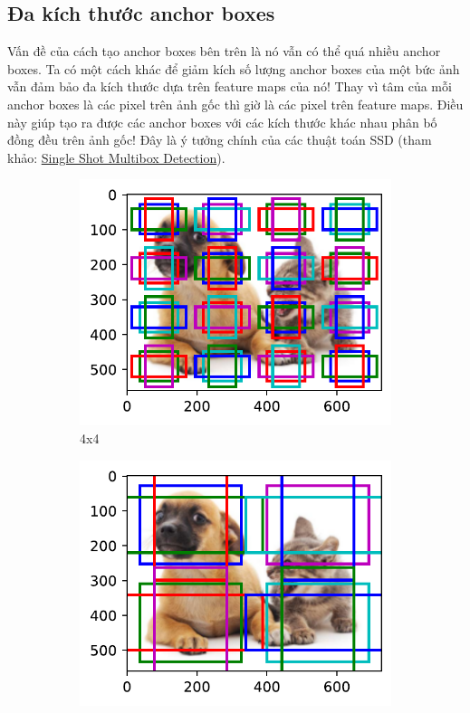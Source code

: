 \documentclass{article}
\begin{document}
\subsection{Đa kích thước anchor boxes}
Vấn đề của cách tạo anchor boxes bên trên là nó vẫn có thể quá nhiều anchor boxes. Ta có một cách khác để giảm kích số lượng anchor boxes của một bức ảnh vẫn đảm bảo đa kích thước dựa trên feature maps của nó! Thay vì tâm của mỗi anchor boxes là các pixel trên ảnh gốc thì giờ là các pixel trên feature maps. Điều này giúp tạo ra được các anchor boxes với các kích thước khác nhau phân bố đồng đều trên ảnh gốc! Đây là ý tưởng chính của các thuật toán SSD (tham khảo: \href{https://d2l.ai/chapter_computer-vision/ssd.html}{Single Shot Multibox Detection}).

\begin{figure}[ht!]
    \centering
    \begin{subfigure}[b]{0.45\linewidth}
    \includegraphics[width = \linewidth]{output_multiscale-object-detection_ad7147_21_0.pdf}
    \caption{4x4}
    \label{fig5a}
    \end{subfigure}
    \begin{subfigure}[b]{0.45\linewidth}
        \includegraphics[width = \linewidth]{output_multiscale-object-detection_ad7147_30_0.pdf}

\end{subfigure}
\end{figure}
\end{document}
